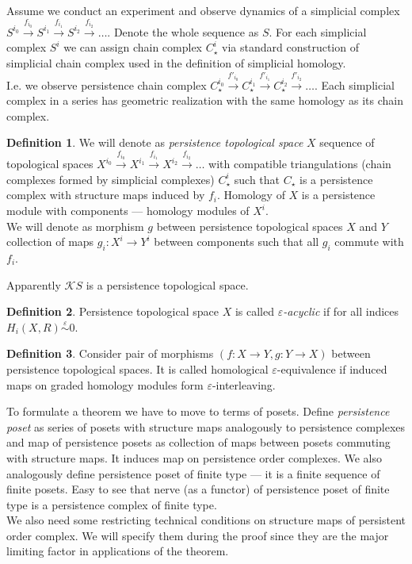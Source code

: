 \documentclass[a4paper, 12pt]{article}
\theoremstyle{definition}
\newtheorem{definition}{Definition}
\theoremstyle{remark}
\newcommand{\define}[1]{{\textit{#1}}}
\begin{document}
Assume we conduct an experiment and observe dynamics of a simplicial complex $S^{i_0} \xrightarrow{f_{i_0}} S^{i_1} \xrightarrow{f_{i_1}} S^{i_2} \xrightarrow{f_{i_2}} \ldots$. Denote the whole sequence as $S$. For each simplicial complex $S^{i}$ we can assign chain complex $C_{\star}^{i}$ via standard construction of simplicial chain complex used in the definition of simplicial homology.\\

I.e. we observe persistence chain complex $C_{\star}^{i_0} \xrightarrow{f'_{i_0}} C_{\star}^{i_1} \xrightarrow{f'_{i_1}} C_{\star}^{i_2} \xrightarrow{f'_{i_2}} \ldots$. Each simplicial complex in a series has geometric realization with the same homology as its chain complex.

\begin{definition}
  We will denote as \define{persistence topological space} $X$ sequence of topological spaces $X^{i_0} \xrightarrow{f_{i_0}} X^{i_1} \xrightarrow{f_{i_1}} X^{i_2} \xrightarrow{f_{i_2}} \ldots$ with compatible triangulations (chain complexes formed by simplicial complexes) $C_{\star}^{i}$ such that $C_{\star}$ is a persistence complex with structure maps induced by $f_i$. Homology of $X$ is a persistence module with components --- homology modules of $X^i$.\\

  We will denote as morphism $g$ between persistence topological spaces $X$ and $Y$ collection of maps $g_i : X^i \to Y^i$ between components such that all $g_i$ commute with $f_i$.
\end{definition}

Apparently $\mathcal{K}S$ is a persistence topological space.\\

\begin{definition}
  Persistence topological space $X$ is called \define{$\varepsilon$-acyclic} if for all indices\\ $H_i(X,R) \stackrel{\varepsilon}{\sim} 0$.
\end{definition}

\begin{definition}
  Consider pair of morphisms $(f : X \to Y, g : Y \to X)$ between persistence topological spaces. It is called homological $\varepsilon$-equivalence if induced maps on graded homology modules form $\varepsilon$-interleaving.
\end{definition}

To formulate a theorem we have to move to terms of posets. Define \define{persistence poset} as series of posets with structure maps analogously to persistence complexes and map of persistence posets as collection of maps between posets commuting with structure maps. It induces map on persistence order complexes. We also analogously define persistence poset of finite type --- it is a finite sequence of finite posets. Easy to see that nerve (as a functor) of persistence poset of finite type is a persistence complex of finite type.\\
We also need some restricting technical conditions on structure maps of persistent order complex. We will specify them during the proof since they are the major limiting factor in applications of the theorem.
\end{document}
